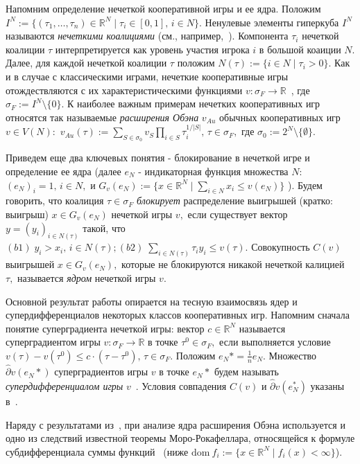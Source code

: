 Напомним определение нечеткой ко\-опе\-ра\-тив\-ной игры и ее ядра. Положим $I^N := \{(\tau_1, \ldots, \tau_n)
\in \mathbb{R}^N \mid \tau_i \in [0,1], \, i \in N\}.$ Ненулевые элементы гиперкуба $I^N$ называются {\it нечеткими коалициями} (см., например,~\cite{A93}). Компонента $\tau_i$ нечеткой коалиции $\tau$ интерпретируется как уровень участия игрока $i$ в большой коаиции $N.$  Далее, для каждой нечеткой коалиции $\tau$ положим $N(\tau) := \{i \in N \mid \tau_i > 0\}.$ Как и в случае с клас\-си\-чес\-ки\-ми играми, нечеткие ко\-опе\-ра\-тив\-ные игры отож\-дест\-вля\-ют\-ся с их ха\-рак\-те\-рис\-ти\-чес\-ки\-ми функциями $v:\sigma_F \rightarrow \mathbb{R}$~\cite{A93}, где $\sigma_F := I^N \setminus \{0\}$. К наиболее важным примерам нечетких ко\-опе\-ра\-тив\-ных игр относятся так называемые {\it расширения Обэна}  $v_{Au}$ обычных ко\-опе\-ра\-тив\-ных игр $v \in V(N):$ $v_{Au}(\tau) := \sum_{S \in \sigma_0}v_S \prod_{i \in S}\tau_i^{1/|S|}, \, \tau \in \sigma_F,$ где $\sigma_0 := 2^N \setminus \{\emptyset\}.$

Приведем еще два ключевых понятия - блокирование в нечеткой игре и определение ее ядра
(далее $e_N$ - индикаторная функция множества $N:$ $(e_N)_i = 1, \, i \in N,$ и $G_v(e_N) := \{x \in \mathbb{R}^N \mid \sum_{i \in N}x_i \leq v(e_N)\}$ ). Будем говорить, что коалиция $\tau \in \sigma_F$ {\it блокирует} распределение выигрышей (кратко: выигрыш) $x \in G_v(e_N)$ нечеткой игры $v,$ если существует вектор $y = (y_i)_{i \in N(\tau)}$ такой, что $(b1) \; y_i > x_i, \, i \in N(\tau); (b2) \; \sum_{i \in N(\tau)}\tau_i y_i \leq v(\tau).$ Совокупность $C(v)$ выигрышей $x \in G_v(e_N),$ которые не блокируются никакой нечеткой калицией $\tau,$ называется {\it ядром} нечеткой игры $v.$

Основной результат работы опирается на тесную вза\-имо\-связь ядер и су\-пер\-диф\-фе\-рен\-циа\-лов некоторых классов ко\-опе\-ра\-тив\-ных игр. Напомним сначала понятие су\-пер\-гра\-ди\-ен\-та нечеткой игры: вектор $c \in \mathbb{R}^N$ называется су\-пер\-гра\-ди\-ен\-том игры $v: \sigma_F \rightarrow \mathbb{R}$ в точке
$\tau^0 \in \sigma_F,$ если выполняется условие $v(\tau) - v(\tau^0) \leq c \cdot (\tau - \tau^0), \, \tau \in \sigma_F.$ Положим $e_N* = \frac{1}{n}e_N.$ Множество $\hat{\partial} v(e_N*)$ су\-пер\-гра\-ди\-ен\-тов игры $v$ в точке $e_N*$ будем называть {\it су\-пер\-диф\-фе\-рен\-циа\-лом игры} $v$~\cite{V21}. Условия совпадения $C(v)$ и $\hat{\partial} v(e_N^*)$ указаны в~\cite{V21}.

Наряду с результатами из~\cite{V21}, при анализе ядра расширения Обэна используется и одно из следствий известной теоремы Моро-Ро\-ка\-фел\-ла\-ра, от\-но\-ся\-щей\-ся к формуле суб\-диф\-фе\-рен\-циа\-ла суммы  
функций~\cite{IT74} (ниже $\mbox{dom}~f_i := \{x \in \mathbb{R}^N \mid f_i(x) < \infty\}$).


